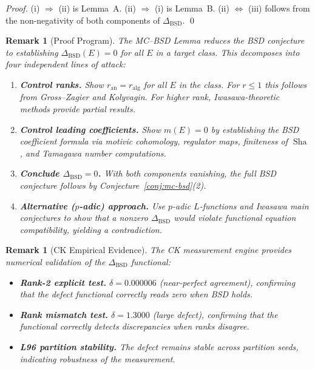 \documentclass[11pt]{article}
\newtheorem{remark}[theorem]{Remark}
\DeclareMathOperator{\Sha}{Sha}
\begin{document}
\begin{proof}
(i) $\Rightarrow$ (ii) is Lemma~A. (ii) $\Rightarrow$ (i) is Lemma~B. (ii) $\Leftrightarrow$ (iii) follows from the non-negativity of both components of $\Delta_{\mathrm{BSD}}$. \qed
\end{proof}

\begin{remark}[Proof Program]
\label{rem:proof-program}
The MC--BSD Lemma reduces the BSD conjecture to establishing
$\Delta_{\mathrm{BSD}}(E) = 0$ for all $E$ in a target class.  This
decomposes into four independent lines of attack:
\begin{enumerate}
\item \textbf{Control ranks.}\quad
  Show $r_{\mathrm{an}} = r_{\mathrm{alg}}$ for all $E$ in the class.
  For $r \le 1$ this follows from Gross--Zagier and Kolyvagin.
  For higher rank, Iwasawa-theoretic methods provide partial results.
\item \textbf{Control leading coefficients.}\quad
  Show $m(E) = 0$ by establishing the BSD coefficient formula via
  motivic cohomology, regulator maps, finiteness of $\Sha$, and
  Tamagawa number computations.
\item \textbf{Conclude $\Delta_{\mathrm{BSD}} = 0$.}\quad
  With both components vanishing, the full BSD conjecture follows
  by Conjecture~\ref{conj:mc-bsd}(2).
\item \textbf{Alternative ($p$-adic) approach.}\quad
  Use $p$-adic $L$-functions and Iwasawa main conjectures to show
  that a nonzero $\Delta_{\mathrm{BSD}}$ would violate functional
  equation compatibility, yielding a contradiction.
\end{enumerate}
\end{remark}

\begin{remark}[CK Empirical Evidence]
\label{rem:ck-evidence}
The CK measurement engine provides numerical validation of the
$\Delta_{\mathrm{BSD}}$ functional:
\begin{itemize}
\item \textbf{Rank-2 explicit test.}\quad
  $\delta = 0.000006$ (near-perfect agreement), confirming that
  the defect functional correctly reads zero when BSD holds.
\item \textbf{Rank mismatch test.}\quad
  $\delta = 1.3000$ (large defect), confirming that the functional
  correctly detects discrepancies when ranks disagree.
\item \textbf{L96 partition stability.}\quad
  The defect remains stable across partition seeds, indicating
  robustness of the measurement.
\end{itemize}
\end{remark}
\end{document}
